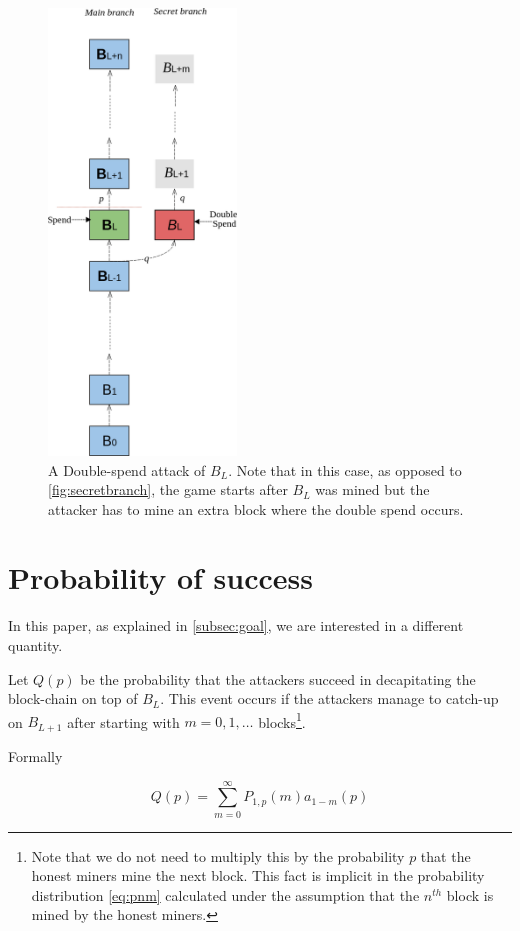 \documentclass[letterpaper,12pt]{report}
\theoremstyle{plain}
\theoremstyle{definition}
\begin{document}
\begin{figure}[pos]
\centering
\includegraphics[width=50mm]{Doublespend.png}
\caption{A Double-spend attack of $\mathit{B}_L$. Note that in this case, as opposed to \ref{fig:secretbranch}, the game starts after $\mathit{B}_L$ was mined but the attacker has to mine an extra block where the double spend occurs.}
\label{fig:doublespend}
\end{figure}

\section{Probability of success}

In this paper, as explained in \ref{subsec:goal}, we are interested in a different quantity.

Let $\mathit{Q}(p)$  be the probability that the attackers succeed in decapitating the block-chain on top of $\mathit{B}_L$. This event occurs if the attackers manage to catch-up on $B_{L+1}$ after starting with $m=0,1,\dots$ blocks\footnote{Note that we do not need to multiply this by the probability $p$ that the honest miners mine the next block. This fact is implicit in the probability distribution \ref{eq:pnm} calculated under the assumption that the $n^{th}$ block is mined by the honest miners.}.

Formally 

\begin{equation}\label{eq:rnpdef}
\mathit{Q}(p)=\sum_{m=0}^{\infty}\mathit{P}_{1,p}(m)\mathit{a}_{1-m}(p)
\end{equation}
\end{document}
